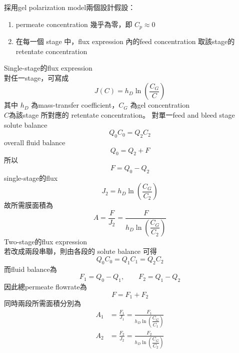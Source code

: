 ﻿\documentclass[12pt,a4paper]{article}
\begin{document}
\begin{problems}
採用gel polarization model兩個設計假設：
\begin{enumerate}
  \item permeate concentration 幾乎為零，即 $C_p \approx 0$
  \item 在每一個 stage 中，flux expression 內的feed concentration 取該stage的retentate concentration
\end{enumerate}
Single-stage的flux expression\\
對任一stage，可寫成
\begin{equation}
  J(C)=h_D\ln\left(\frac{C_G}{C}\right)
\end{equation}
其中 $h_D$ 為mass-transfer coefficient，$C_G$ 為gel concentration\\
$C$為該stage 所對應的 retentate concentration。
對單一feed and bleed stage\\
solute balance
\begin{equation}
  Q_0C_0 = Q_2C_2
\end{equation}
overall fluid balance
\begin{equation}
  Q_0 = Q_2 + F
\end{equation}
所以
\begin{equation}
  F = Q_0 - Q_2
\end{equation}
single-stage的flux
\begin{equation}
  J_2 = h_D\ln\left(\frac{C_G}{C_2}\right)
\end{equation}
故所需膜面積為
\begin{equation}
  A = \frac{F}{J_2}
    = \frac{F}{h_D\ln\left(\dfrac{C_G}{C_2}\right)}
  \label{eq:A_single}
\end{equation}
Two-stage的flux expression\\
若改成兩段串聯，則由各段的 solute balance 可得
\begin{equation}
  Q_0C_0 = Q_1C_1 = Q_2C_2
\end{equation}
而fluid balance為
\begin{equation}
  F_1 = Q_0-Q_1,   \qquad F_2 = Q_1-Q_2
\end{equation}
因此總permeate flowrate為
\begin{equation}
  F = F_1 + F_2
  \label{eq:Fsum}
\end{equation}
同時兩段所需面積分別為
\begin{align}
  A_1 &= \frac{F_1}{J_1} = \frac{F_1}{h_D\ln\left(\dfrac{C_G}{C_1}\right)}\\
  A_2 &= \frac{F_2}{J_2} =  \frac{F_2}{h_D\ln\left(\dfrac{C_G}{C_2}\right)}
\end{align}

\end{problems}
\end{document}
